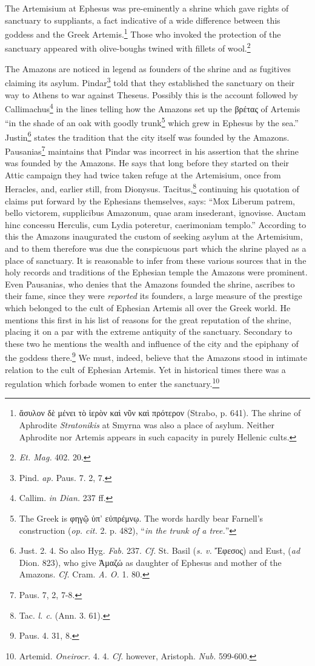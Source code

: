 \documentclass[a4paper, 12pt, oneside]{article}
\begin{document}
The Artemisium at Ephesus was pre-eminently a shrine which gave rights of sanctuary to suppliants, a fact indicative of a wide difference between this goddess and the Greek Artemis.\footnote{ἄσυλον δὲ μένει τὸ ἱερὸν καὶ νῦν καὶ πρότερον (Strabo, p. 641). The shrine of Aphrodite \emph{Stratonikis} at Smyrna was also a place of asylum. Neither Aphrodite nor Artemis appears in such capacity in purely Hellenic cults.} Those who invoked the protection of the sanctuary appeared with olive-boughs twined with fillets of wool.\footnote{\emph{Et. Mag.} 402. 20.}

The Amazons are noticed in legend as founders of the shrine and as fugitives claiming its asylum. Pindar\footnote{Pind. \emph{ap.} Paus. 7. 2, 7.} told that they established the sanctuary on their way to Athens to war against Theseus. Possibly this is the account followed by Callimachus\footnote{Callim. \emph{in Dian.} 237 ff.} in the lines telling how the Amazons set up the βρέτας of Artemis ``in the shade of an oak with goodly trunk\footnote{The Greek is φηγῷ ὑπ' εὐπρέμνῳ. The words hardly bear Farnell's construction (\emph{op. cit.} 2. p. 482), ``\emph{in the trunk of a tree.}''} which grew in Ephesus by the sea.'' Justin\footnote{Just. 2. 4. So also Hyg. \emph{Fab.} 237. \emph{Cf.} St. Basil (\emph{s. v.} Ἔφεσος) and Eust, (\emph{ad} Dion. 823), who give Ἀμαζώ as daughter of Ephesus and mother of the Amazons. \emph{Cf.} Cram. \emph{A. O.} 1. 80.} states the tradition that the city itself was founded by the Amazons. Pausanias\footnote{Paus. 7, 2, 7-8.} maintains that Pindar was incorrect in his assertion that the shrine was founded by the Amazons. He says that long before they started on their Attic campaign they had twice taken refuge at the Artemisium, once from Heracles, and, earlier still, from Dionysus. Tacitus,\footnote{Tac. \emph{l. c.} (Ann. 3. 61).} continuing his quotation of claims put forward by the Ephesians themselves, says: ``Mox Liberum patrem, bello victorem, supplicibus Amazonum, quae aram insederant, ignovisse. Auctam hinc concessu Herculis, cum Lydia poteretur, caerimoniam templo.'' According to this the Amazons inaugurated the custom of seeking asylum at the Artemisium, and to them therefore was due the conspicuous part which the shrine played as a place of sanctuary. It is reasonable to infer from these various sources that in the holy records and traditions of the Ephesian temple the Amazons were prominent. Even Pausanias, who denies that the Amazons founded the shrine, ascribes to their fame, since they were \emph{reported} its founders, a large measure of the prestige which belonged to the cult of Ephesian Artemis all over the Greek world. He mentions this first in his list of reasons for the great reputation of the shrine, placing it on a par with the extreme antiquity of the sanctuary. Secondary to these two he mentions the wealth and influence of the city and the epiphany of the goddess there.\footnote{Paus. 4. 31, 8.} We must, indeed, believe that the Amazons stood in intimate relation to the cult of Ephesian Artemis. Yet in historical times there was a regulation which forbade women to enter the sanctuary.\footnote{Artemid. \emph{Oneirocr.} 4. 4. \emph{Cf.} however, Aristoph. \emph{Nub.} 599-600.}
\end{document}
